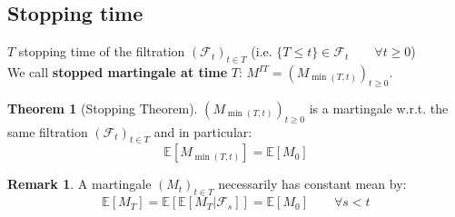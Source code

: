 \documentclass[10pt,a4paper]{article}
\theoremstyle{definition}
\newtheorem{teo}{Theorem}[section]
\newtheorem*{rem}{Remark}
\begin{document}
\subsection{Stopping time}
$T$ stopping time of the filtration $(\mathcal{F}_t)_{t\in T}$ (i.e. $\{T\leq t\}\in\mathcal{F}_t \qquad\forall t\geq0$)\\
We call \textbf{stopped martingale at time} $T$: $M^{IT}=(M_{\min{(T,t)}})_{t\geq0}$.
\begin{teo}[Stopping Theorem]
	$(M_{\min{(T,t)}})_{t\geq0}$ is a martingale w.r.t. the same filtration $(\mathcal{F}_t)_{t\in T}$ and in particular:
	\begin{equation}
		\mathbb{E}[M_{\min{(T,t)}}]=\mathbb{E}[M_{0}]
	\end{equation}
\end{teo}
\begin{rem}
	A martingale $(M_t)_{t\in T}$ necessarily has constant mean by:
	\begin{equation*}
		\mathbb{E}[M_{T}]=\mathbb{E}[\mathbb{E}[M_{T}|\mathcal{F}_s]]=\mathbb{E}[M_{0}] \qquad \forall s<t
	\end{equation*} 
\end{rem}
\end{document}
